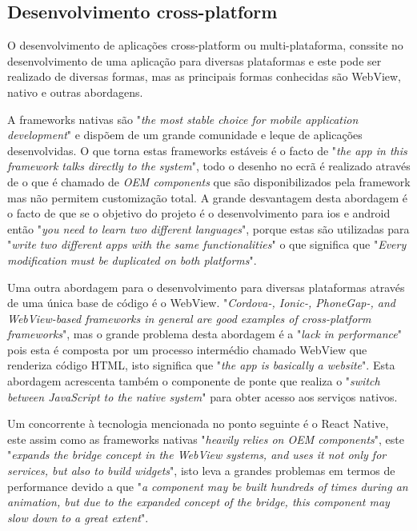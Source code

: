 \subsection{Desenvolvimento cross-platform}
O desenvolvimento de aplicações cross-platform ou multi-plataforma, conssite no desenvolvimento de uma aplicação para diversas plataformas e este pode ser realizado de diversas formas, mas as principais formas conhecidas são WebView, nativo e outras abordagens.

A frameworks nativas são "\emph{the most stable choice for mobile application development}"\citep{flutter} e dispõem de um grande comunidade e leque de aplicações desenvolvidas. O que torna estas frameworks estáveis é o facto de "\emph{the app in this framework talks directly to the system}"\citep{flutter}, todo o desenho no ecrã é realizado através de o que é chamado de \emph{OEM components} que são disponibilizados pela framework mas não permitem customização total. A grande desvantagem desta abordagem é o facto de que se o objetivo do projeto é o desenvolvimento para ios e android então "\emph{you need to learn two different languages}"\citep{flutter}, porque estas são utilizadas para "\emph{write two different apps with the same functionalities}"\citep{flutter} o que significa que "\emph{Every modification must be duplicated on both platforms}"\citep{flutter}.

Uma outra abordagem para o desenvolvimento para diversas plataformas através de uma única base de código é o WebView. "\emph{Cordova-, Ionic-, PhoneGap-, and WebView-based frameworks in general are good examples of cross-platform frameworks}"\citep{flutter}, mas o grande problema desta abordagem é a "\emph{lack in performance}"\citep{flutter} pois esta é composta por um processo intermédio chamado WebView que renderiza código HTML, isto significa que "\emph{the app is basically a website}"\citep{flutter}.
Esta abordagem acrescenta também o componente de ponte que realiza o "\emph{switch between JavaScript to the native system}"\citep{flutter} para obter acesso aos serviços nativos.

Um concorrente à tecnologia mencionada no ponto seguinte é o React Native, este assim como as frameworks nativas "\emph{heavily relies on OEM components}"\citep{flutter}, este "\emph{expands the bridge concept in the WebView systems, and uses it not only for services, but also to build widgets}"\citep{flutter}, isto leva a grandes problemas em termos de performance devido a que "\emph{a component may be built hundreds of times during an animation, but due to the expanded concept of the bridge, this component may slow down to a great extent}"\citep{flutter}.